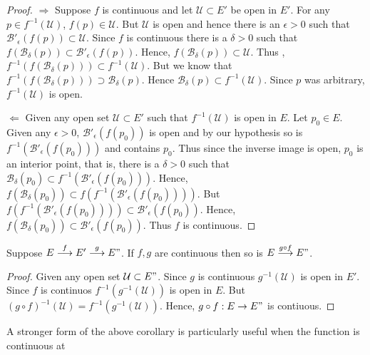 \begin{proof}
    $\Rightarrow$ Suppose $f$ is continuous and let $\mathcal{U} \subset E'$ be open in $E'$. For
    any $p \in f^{-1}(\mathcal{U})$, $f(p) \in \mathcal{U}$. But $\mathcal{U}$ is open and hence there
    is an $\epsilon > 0$ such that $\mathcal{B}'_{\epsilon}(f(p)) \subset \mathcal{U}$. Since $f$ is
    continuous there is a $\delta > 0$ such that $f(\mathcal{B}_{\delta}(p)) \subset \mathcal{B}'_
    {\epsilon}(f(p))$. Hence, $f(\mathcal{B}_{\delta}(p)) \subset \mathcal{U}$. Thus ,
    $f^{-1}\left( f(\mathcal{B}_{\delta}(p))\right) \subset f^{-1}(\mathcal{U})$. But we know that 
    $f^{-1}\left( f(\mathcal{B}_{\delta}(p))\right) \supset \mathcal{B}_{\delta}(p)$. Hence
    $\mathcal{B}_{\delta}(p) \subset f^{-1}(\mathcal{U})$. Since $p$ was arbitrary,
    $f^{-1}(\mathcal{U})$ is open.  

    $\Leftarrow$ Given any open set $\mathcal{U} \subset E'$ such that $f^{-1}(\mathcal{U})$ is open in
    $E$. Let $p_0 \in E$. Given any $\epsilon > 0$, $\mathcal{B}'_{\epsilon}(f(p_0))$ is open and by
    our hypothesis so is $f^{-1}\left( \mathcal{B}'_{\epsilon}(f(p_0))\right)$ and contains $p_0$.
    Thus since the inverse image is open, $p_0$ is an interior point, that is, 
    there is a $\delta > 0$ such that $\mathcal{B}_{\delta}(p_0) \subset 
    f^{-1}\left( \mathcal{B}'_{\epsilon}(f(p_0))\right)$. Hence, 
    $f\left(\mathcal{B}_{\delta}(p_0)\right) \subset f\left(f^{-1}\left( \mathcal{B}'_{\epsilon}
    (f(p_0))\right) \right)$. But $f\left(f^{-1}\left(\mathcal{B}'_{\epsilon}(f(p_0))\right)
    \right) \subset \mathcal{B}'_{\epsilon}(f(p_0))$. Hence, $f\left(\mathcal{B}_{\delta}(p_0)\right) 
    \subset \mathcal{B}'_{\epsilon}(f(p_0))$. Thus $f$ is continuous.
\end{proof}
\begin{Corollary}
    Suppose $ E \stackrel{f}{\longrightarrow} E' \stackrel{g}{\longrightarrow} E"$. If $f,g$ are
    continuous then so is $E \stackrel{g \circ f}{\longrightarrow} E"$.
\end{Corollary}
\begin{proof}
    Given any open set $\mathcal{U} \subset E"$. Since $g$ is continuous $g^{-1}(\mathcal{U})$ is
    open in $E'$. Since $f$ is continuos $f^{-1}(g^{-1}(\mathcal{U}))$ is open in $E$. But $(g\circ
    f)^{-1}(\mathcal{U}) = f^{-1}(g^{-1}(\mathcal{U}))$. Hence, $g \circ f : E \to E"$ is
    contiuous.
\end{proof}
A stronger form of the above corollary is particularly useful when the function is continuous at
